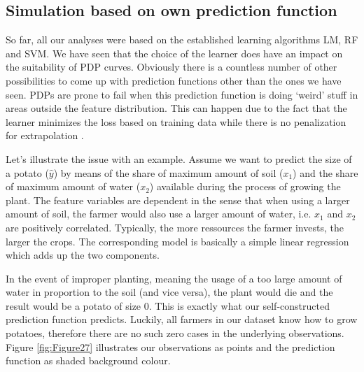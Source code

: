 \documentclass[]{krantz}
\begin{document}
\subsection{Simulation based on own prediction
function}\label{ExtrapolationProblemPrediction}

So far, all our analyses were based on the established learning
algorithms LM, RF and SVM. We have seen that the choice of the learner
does have an impact on the suitability of PDP curves. Obviously there is
a countless number of other possibilities to come up with prediction
functions other than the ones we have seen. PDPs are prone to fail when
this prediction function is doing `weird' stuff in areas outside the
feature distribution. This can happen due to the fact that the learner
minimizes the loss based on training data while there is no penalization
for extrapolation \citep{molnar2019}.

Let's illustrate the issue with an example. Assume we want to predict
the size of a potato (\(\hat{y}\)) by means of the share of maximum
amount of soil (\(x_1\)) and the share of maximum amount of water
(\(x_2\)) available during the process of growing the plant. The feature
variables are dependent in the sense that when using a larger amount of
soil, the farmer would also use a larger amount of water, i.e. \(x_1\)
and \(x_2\) are positively correlated. Typically, the more ressources
the farmer invests, the larger the crops. The corresponding model is
basically a simple linear regression which adds up the two components.

In the event of improper planting, meaning the usage of a too large
amount of water in proportion to the soil (and vice versa), the plant
would die and the result would be a potato of size 0. This is exactly
what our self-constructed prediction function predicts. Luckily, all
farmers in our dataset know how to grow potatoes, therefore there are no
such zero cases in the underlying observations. Figure
\ref{fig:Figure27} illustrates our observations as points and the
prediction function as shaded background colour.
\end{document}
